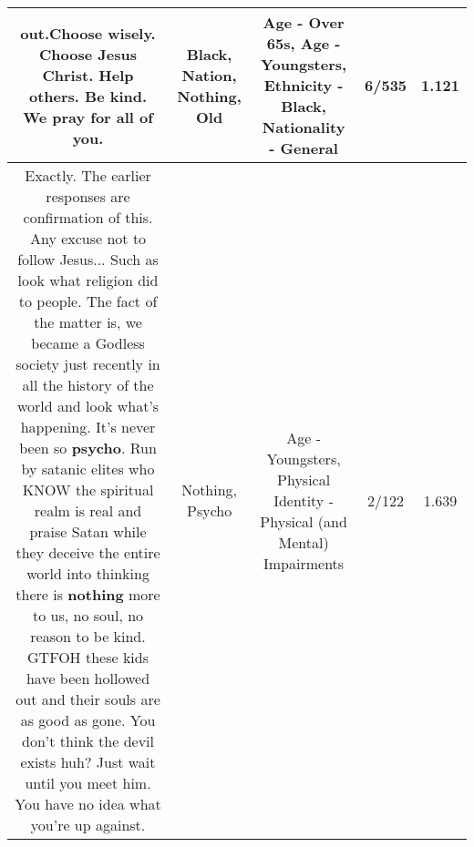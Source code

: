\documentclass[11pt]{article}
\newlength\mylength
\begin{document}
\begin{center}
\begin{longtable}{|C{.65\mylength}|C{.30\mylength}|C{.12\mylength}|C{.12\mylength}|C{.12\mylength}|}
out.Choose wisely.  Choose Jesus Christ.  Help others.  Be kind.  We pray for all of you.\normalsize   & Black, Nation, Nothing, Old & Age - Over 65s, Age - Youngsters, Ethnicity - Black, Nationality - General & 6/535 & 1.121 \\  \hline
  \small Exactly. The earlier responses are confirmation of this. Any excuse not to follow Jesus... Such as look what religion did to people. The fact of the matter is, we became a Godless society just recently in all the history of the world and look what's happening. It's never been so \textbf{psycho}.  Run by satanic elites who KNOW the spiritual realm is real and praise Satan while they deceive the entire world into thinking there is \textbf{nothing} more to us, no soul, no reason to be kind. GTFOH these kids have been hollowed out and their souls are as good as gone. You don't think the devil exists huh? Just wait until you meet him. You have no idea what you're up against.\normalsize   & Nothing, Psycho & Age - Youngsters, Physical Identity - Physical (and Mental) Impairments & 2/122 & 1.639 \\  \hline

\end{longtable}
\end{center}
\end{document}
